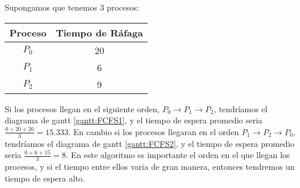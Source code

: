 \documentclass{article}
\begin{document}
Supongamos que tenemos 3 procesos:
\begin{center}
\begin{tabular}{c|c}
	Proceso & Tiempo de Ráfaga \\ \hline
	$P_{0}$ & 20 \\ \hline
	$P_{1}$ & 6 \\ \hline
	$P_{2}$ & 9 \\ \hline
\end{tabular}
\end{center}

Si los procesos llegan en el siguiente orden, $P_{0} \rightarrow P_{1} \rightarrow P_{2}$, tendríamos el diagrama de gantt \ref{gantt:FCFS1},
y el tiempo de espera promedio seria $\frac{0 + 20 + 26}{3} = 15.333$. \newline
En cambio si los procesos llegaran en el orden $P_{1} \rightarrow P_{2} \rightarrow P_{0}$, tendríamos el diagrama de gantt \ref{gantt:FCFS2},
y el tiempo de espera promedio seria $\frac{0 + 6 + 15}{3} = 8$. \newline
En este algoritmo es importante el orden en el que llegan los procesos, y si el tiempo entre ellos varia de gran manera, entonces tendremos
un tiempo de espera alto.

\vspace{0.4cm}
\end{document}
